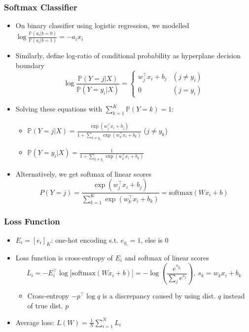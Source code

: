 \subsubsection*{Softmax Classifier}
\begin{itemize}
    \item On binary classifier using logistic regression, we modelled $\log\frac{\mathbb{P}(a_i|b=0)}{\mathbb{P}(a_i|b=1)}=-a_ix_i$
    \item Similarly, define log-ratio of conditional probability as hyperplane decision boundary
    \begin{equation}
        \log\frac{\mathbb{P}(Y=j|X)}{\mathbb{P}(Y=y_i|X)}=\begin{cases}
            w_j^{\top}x_i+b_j & (j\neq y_i)\\
            0 & (j=y_i)
        \end{cases}
    \end{equation}
    \item Solving these equations with $\sum_{k=1}^K\mathbb{P}(Y=k)=1$:
    \begin{itemize}
        \item $\mathbb{P}(Y=j|X)=\frac{\exp(w_j^{\top}x_i+b_j)}{1+\sum_{k\neq y_i}\exp(w_k^{\top}x_i+b_k)}$ ($j\neq y_k$)
        \item $\mathbb{P}(Y=y_i|X)=\frac{1}{1+\sum_{k\neq y_i}\exp(w_k^{\top}x_i+b_k)}$
    \end{itemize}
    \item Alternatively, we get softmax of linear scores
    \begin{equation}
        P(Y=j)=\frac{\exp(w_j^{\top}x_i+b_j)}{\sum_{k=1}^K\exp(w_k^{\top}x_i+b_k)}=\text{softmax}(Wx_i+b)
    \end{equation}
\end{itemize}

\subsubsection*{Loss Function}
\begin{itemize}
    \item $E_i=[e_i]_K$: one-hot encoding s.t. $e_{y_i}=1$, else is $0$
    \item Loss function is cross-entropy of $E_i$ and softmax of linear scores
    \begin{equation}
        L_i=-E_i^{\top}\log\Bigr[\text{softmax}(Wx_i+b)\Bigr]=-\log\left(\frac{e^{s_{y_i}}}{\sum_j e^{s_j}}\right),~s_k=w_kx_i+b_k
    \end{equation}
    \begin{itemize}
        \item Cross-entropy $-p^{\top}\log q$ is a discrepancy caused by using dist. $q$ instead of true dist. $p$
    \end{itemize}
    \item Average loss: $L(W)=\frac{1}{N}\sum_{i=1}^NL_i$
\end{itemize}
